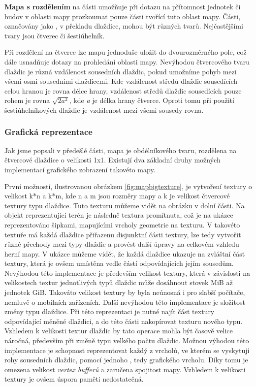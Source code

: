 \textbf{Mapa s rozdělením} na části umožňuje při dotazu na přítomnost jednotek či budov v oblasti mapy prozkoumat pouze části tvořící tuto oblast mapy. Části, označovány jako \textit{ }, v překladu dlaždice, mohou být různých tvarů. Nejčastějšími tvary jsou čtverec či šestiúhelník. 

Při rozdělení na čtverce lze mapu jednoduše uložit do dvourozměrného pole, což dále usnadňuje dotazy na prohledání oblasti mapy. Nevýhodou čtvercového tvaru dlaždic je různá vzdálenost sousedních dlaždic, pokud umožníme pohyb mezi všemi osmi sousedními dlaždicemi. Kde vzdálenost středů dlaždic sousedících celou hranou je rovna délce hrany, vzdálenost středů dlaždic sousedících pouze rohem je rovna \(\sqrt{2a^2}\), kde \textit{a} je délka hrany čtverce. Oproti tomu při použití šestiúhelníkových dlaždic je vzdálenost mezi všemi sousedy rovna. 

\subsubsection{Grafická reprezentace} 
Jak jsme popsali v předešlé části, mapa je obdélníkového tvaru, rozdělena na čtvercové dlaždice o velikosti 1x1. Existují dva základní druhy možných implementací grafického zobrazení takovéto mapy.

První možností, ilustrovanou obrázkem \ref{fig:mapbigtexture}, je vytvoření textury o velikost k*n a k*m, kde n a m jsou rozměry mapy a k je velikost čtvercové textury typu dlaždice. Tuto texturu můžeme vidět na obrázku v dolní části. Na objekt reprezentující terén je následně textura promítnuta, což je na ukázce reprezentováno šipkami, mapujícími vrcholy geometrie na texturu. V takovéto textuře má každá dlaždice přiřazenu disjunktní části textury, lze tedy vytvořit různé přechody mezi typy dlaždic a provést další úpravy na celkovém vzhledu herní mapy. V ukázce můžeme vidět, že každá dlaždice ukazuje na zvláštní část textury, která je ovšem umístěna vedle částí odpovídajících jejím sousedům. Nevýhodou této implementace je především velikost textury, která v závislosti na velikostech textur jednotlivých typů dlaždic může dosáhnout stovek MiB až jednotek GiB. Takováto velikost textury by byla neúnosná i pro slabší počítače, nemluvě o mobilních zařízeních. Další nevýhodou této implementace je složitost změny typu dlaždice. Při této reprezentaci je nutné najít část textury odpovídající měněné dlaždici, a do této části nakopírovat texturu nového typu. Vzhledem k velikosti textur dlaždic by tato operace mohla být časově velice náročná, především při změně typu velkého počtu dlaždic. Možnou výhodou této implementace je schopnost reprezentovat každý z vrcholů, ve kterém se vyskytují rohy sousedních dlaždic, pomocí jednoho , tedy grafického vrcholu. Díky tomu je omezena velikost \textit{vertex bufferů} a zaručena spojitost mapy. Vzhledem k velikosti textury je ovšem úspora paměti nedostatečná.

